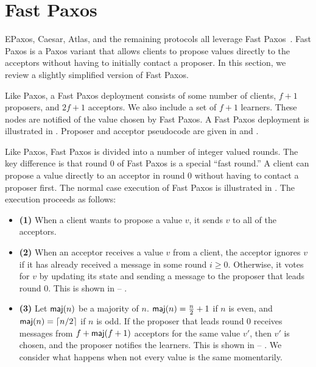 \section{Fast Paxos}
{}
{}
{}

EPaxos, Caesar, Atlas, and the remaining \BPaxos{} protocols all leverage Fast
Paxos~\cite{lamport2006fast}. Fast Paxos is a Paxos variant that allows clients
to propose values directly to the acceptors without having to initially
contact a proposer. In this section, we review a slightly simplified version of
Fast Paxos.

Like Paxos, a Fast Paxos deployment consists of some number of clients, $f+1$
proposers, and $2f+1$ acceptors. We also include a set of $f+1$ learners. These
nodes are notified of the value chosen by Fast Paxos. A Fast Paxos deployment
is illustrated in . Proposer and acceptor pseudocode
are given in  and .

Like Paxos, Fast Paxos is divided into a number of integer valued rounds.  The
key difference is that round 0 of Fast Paxos is a special ``fast round.'' A
client can propose a value directly to an acceptor in round 0 without having to
contact a proposer first. The normal case execution of Fast Paxos is
illustrated in . The execution proceeds as follows:

\begin{itemize}
  \item \textbf{(1)}
    When a client wants to propose a value $v$, it sends $v$ to all of the
    acceptors.

  \item \textbf{(2)}
    When an acceptor receives a value $v$ from a client, the acceptor ignores
    $v$ if it has already received a message in some round $i \geq 0$.
    Otherwise, it votes for $v$ by updating its state and sending a
     message to the proposer that leads round $0$. This is
    shown in   --
    .

  \item \textbf{(3)}
    Let $\textsf{maj}(n)$ be a majority of $n$. $\textsf{maj}(n) = \frac{n}{2} + 1$ if $n$ is
    even, and $\textsf{maj}(n) = \lceil n/2\rceil$ if $n$ is odd. If the proposer that leads
    round $0$ receives  messages from $f + \textsf{maj}(f+1)$
    acceptors for the same value $v'$, then $v'$ is chosen, and the proposer
    notifies the learners. This is shown in 
     -- . We consider what happens when
    not every value is the same momentarily.
\end{itemize}

